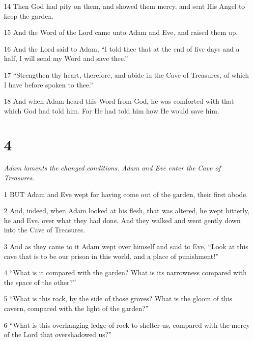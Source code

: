 \par 14 Then God had pity on them, and showed them mercy, and sent His Angel to keep the garden.

\par 15 And the Word of the Lord came unto Adam and Eve, and raised them up.

\par 16 And the Lord said to Adam, “I told thee that at the end of five days and a half, I will send my Word and save thee.”

\par 17 “Strengthen thy heart, therefore, and abide in the Cave of Treasures, of which I have before spoken to thee.”

\par 18 And when Adam heard this Word from God, he was comforted with that which God had told him. For He had told him how He would save him.

\chapter{4}

\par \textit{Adam laments the changed conditions. Adam and Eve enter the Cave of Treasures.}

\par 1 BUT Adam and Eve wept for having come out of the garden, their first abode.

\par 2 And, indeed, when Adam looked at his flesh, that was altered, he wept bitterly, he and Eve, over what they had done. And they walked and went gently down into the Cave of Treasures.

\par 3 And as they came to it Adam wept over himself and said to Eve, “Look at this cave that is to be our prison in this world, and a place of punishment!”

\par 4 “What is it compared with the garden? What is its narrowness compared with the space of the other?”

\par 5 “What is this rock, by the side of those groves? What is the gloom of this cavern, compared with the light of the garden?”

\par 6 “What is this overhanging ledge of rock to shelter us, compared with the mercy of the Lord that overshadowed us?”

